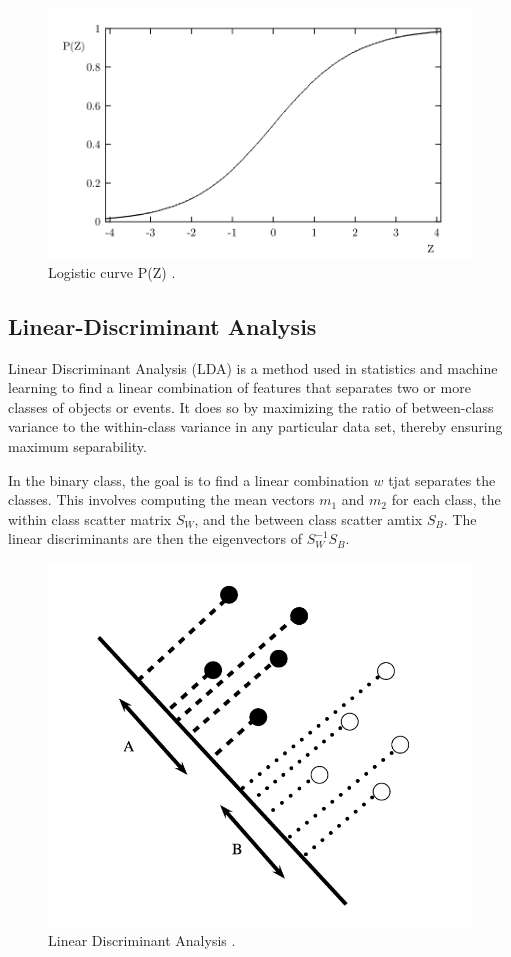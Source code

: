             \begin{figure}[H]
                \centering
                \includegraphics[width=.6\textwidth]{../src/resources/logistic.png}
                \caption{
                    Logistic curve P(Z) \cite{cramer_origins_2002}.
                }
                \label{fig:logistic_regression}
            \end{figure}
        \subsection{Linear-Discriminant Analysis}
            Linear Discriminant Analysis (LDA) is a method used in statistics and machine learning to find a linear combination of features that separates two or more classes of objects or events. It does so by maximizing the ratio of between-class variance to the within-class variance in any particular data set, thereby ensuring maximum separability.

            In the binary class, the goal is to find a linear combination $w$ tjat separates the classes. This involves computing the mean vectors $m_1$ and $m_2$ for each class, the within class scatter matrix $S_W$, and the between class scatter amtix $S_B$. The linear discriminants are then the eigenvectors of $S_W^{-1}S_B$. 

            \begin{figure}[H]
                \centering
                \includegraphics[width=.6\textwidth]{../src/resources/lda.png}
                \caption{
                    Linear Discriminant Analysis \cite{xanthopoulos_linear_2013}.
                }
                \label{fig:linear_discriminant_analysis}
            \end{figure}


